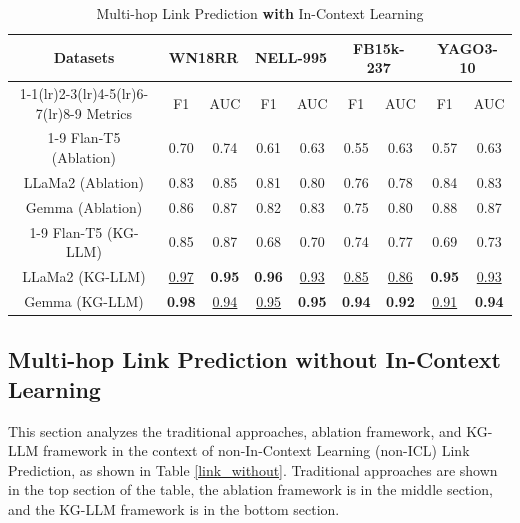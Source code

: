 \documentclass[pmlr]{jmlr}%
\begin{document}
\begin{table}[ht!]
\centering
\caption{Multi-hop Link Prediction \textbf{with} In-Context Learning}
\setlength{\tabcolsep}{2.5pt}
\begin{tabular}{ccccccccc}
\toprule
Datasets & \multicolumn{2}{c}{\textbf{WN18RR}} & \multicolumn{2}{c}{\textbf{NELL-995}} & \multicolumn{2}{c}{\textbf{FB15k-237}} & \multicolumn{2}{c}{\textbf{YAGO3-10}}\\ 
\cmidrule(lr){1-1}\cmidrule(lr){2-3}\cmidrule(lr){4-5}\cmidrule(lr){6-7}\cmidrule(lr){8-9}
Metrics & F1  & AUC  & F1  & AUC & F1  & AUC & F1  & AUC \\
\cmidrule{1-9}
Flan-T5 (Ablation) &0.70 &0.74 &0.61 &0.63& 0.55 & 0.63 & 0.57 & 0.63\\
LLaMa2 (Ablation) &0.83 &0.85 &0.81 &0.80& 0.76 & 0.78 & 0.84 & 0.83\\
Gemma (Ablation) &0.86 &0.87 &0.82 &0.83& 0.75 & 0.80 & 0.88 & 0.87\\
\cmidrule{1-9}
Flan-T5 (KG-LLM) & 0.85 & 0.87 &0.68 &0.70& 0.74 & 0.77 & 0.69 & 0.73\\
LLaMa2 (KG-LLM) & \underline{0.97} & \bf0.95 &\bf0.96 &\underline{0.93}& \underline{0.85} & \underline{0.86} & \bf0.95 & \underline{0.93}\\
Gemma (KG-LLM) & \bf 0.98 & \underline{0.94} &\underline{0.95} &\bf0.95& \bf0.94 & \bf0.92 & \underline{0.91} & \bf0.94\\

\bottomrule
\end{tabular}
\label{link_with}
\end{table}

\subsection{Multi-hop Link Prediction without In-Context Learning}
This section analyzes the traditional approaches, ablation framework, and KG-LLM framework in the context of non-In-Context Learning (non-ICL) Link Prediction, as shown in Table \ref{link_without}. Traditional approaches are shown in the top section of the table, the ablation framework is in the middle section, and the KG-LLM framework is in the bottom section.
\end{document}
